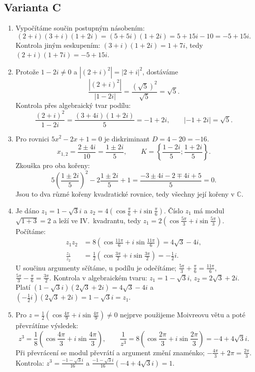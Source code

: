 \documentclass[a4paper,10pt]{article}
\begin{document}
\subsection*{Varianta C}
\begin{enumerate}
\item Vypočítáme součin postupným násobením:
\[
(2+i)(3+i)(1+2i)=(5+5i)(1+2i)=5+15i-10=-5+15i.
\]
Kontrola jiným seskupením:
$(3+i)(1+2i)=1+7i$, tedy $(2+i)(1+7i)=-5+15i$.

\item Protože $1-2i\neq0$ a $|(2+i)^2|=|2+i|^2$, dostáváme
\[
\frac{|(2+i)^2|}{|1-2i|}
=\frac{(\sqrt5)^2}{\sqrt5}=\sqrt5.
\]
Kontrola přes algebraický tvar podílu:
\[
\frac{(2+i)^2}{1-2i}=\frac{(3+4i)(1+2i)}5=-1+2i,
\qquad |-1+2i|=\sqrt5.
\]

\item Pro rovnici $5x^2-2x+1=0$ je diskriminant $D=4-20=-16$.
\[
x_{1,2}=\frac{2\pm4i}{10}=\frac{1\pm2i}{5},
\qquad K=\left\{\frac{1-2i}{5};\frac{1+2i}{5}\right\}.
\]
Zkouška pro oba kořeny:
\[
5\left(\frac{1\pm2i}{5}\right)^2
-2\frac{1\pm2i}{5}+1
=\frac{-3\pm4i-2\mp4i+5}{5}=0.
\]
Jsou to dva různé kořeny kvadratické rovnice, tedy všechny její kořeny v $\mathbb C$.

\item Je dáno $z_1=1-\sqrt3i$ a
$z_2=4(\cos\frac{\pi}{6}+i\sin\frac{\pi}{6})$.
Číslo $z_1$ má modul $\sqrt{1+3}=2$ a leží ve IV.~kvadrantu,
tedy $z_1=2(\cos\frac{5\pi}{3}+i\sin\frac{5\pi}{3})$. Počítáme:
\begin{align*}
z_1z_2
&=8\left(\cos\frac{11\pi}{6}+i\sin\frac{11\pi}{6}\right)
=4\sqrt3-4i,\\
\frac{z_1}{z_2}
&=\frac12\left(\cos\frac{3\pi}{2}+i\sin\frac{3\pi}{2}\right)
=-\frac12i.
\end{align*}
U součinu argumenty sčítáme, u podílu je odečítáme;
$\frac{5\pi}{3}+\frac\pi6=\frac{11\pi}{6}$,
$\frac{5\pi}{3}-\frac\pi6=\frac{3\pi}{2}$.
Kontrola v algebraickém tvaru: $z_1=1-\sqrt3i$, $z_2=2\sqrt3+2i$.
Platí $(1-\sqrt3i)(2\sqrt3+2i)=4\sqrt3-4i$
a $(-\frac12i)(2\sqrt3+2i)=1-\sqrt3i=z_1$.

\item Pro $z=\frac12(\cos\frac{4\pi}{9}+i\sin\frac{4\pi}{9})\neq0$
nejprve použijeme Moivreovu větu a poté převrátíme výsledek:
\[
z^3=\frac18\left(\cos\frac{4\pi}{3}+i\sin\frac{4\pi}{3}\right),
\qquad
\frac1{z^3}=8\left(\cos\frac{2\pi}{3}+i\sin\frac{2\pi}{3}\right)
=-4+4\sqrt3i.
\]
Při převrácení se modul převrátí a argument změní znaménko;
$-\frac{4\pi}{3}+2\pi=\frac{2\pi}{3}$.
Kontrola: $z^3=\frac{-1-\sqrt3i}{16}$ a
$\frac{-1-\sqrt3i}{16}(-4+4\sqrt3i)=1$.
\end{enumerate}
\end{document}

